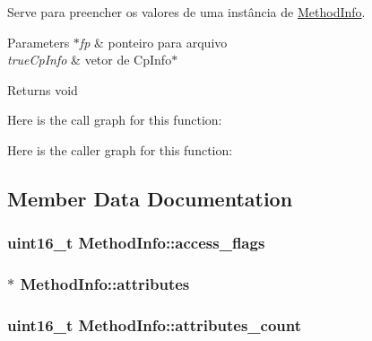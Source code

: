 Serve para preencher os valores de uma instância de \hyperlink{struct_method_info}{Method\+Info}. 


\begin{DoxyParams}{Parameters}
{\em $\ast$fp} & ponteiro para arquivo \\
\hline
{\em true\+Cp\+Info} & vetor de Cp\+Info$\ast$ \\
\hline
\end{DoxyParams}
\begin{DoxyReturn}{Returns}
void 
\end{DoxyReturn}


Here is the call graph for this function\+:




Here is the caller graph for this function\+:




\subsection{Member Data Documentation}
\subsubsection[{\texorpdfstring{access\+\_\+flags}{access_flags}}]{\setlength{\rightskip}{0pt plus 5cm}uint16\+\_\+t Method\+Info\+::access\+\_\+flags}\hypertarget{struct_method_info_ab24f22a8b4e3dcae351b0aa9dc6b7051}{}\label{struct_method_info_ab24f22a8b4e3dcae351b0aa9dc6b7051}
\subsubsection[{\texorpdfstring{attributes}{attributes}}]{$\ast$ Method\+Info\+::attributes}\hypertarget{struct_method_info_af480b7ee48a3812864ef16e3f0b44051}{}\label{struct_method_info_af480b7ee48a3812864ef16e3f0b44051}
\subsubsection[{\texorpdfstring{attributes\+\_\+count}{attributes_count}}]{\setlength{\rightskip}{0pt plus 5cm}uint16\+\_\+t Method\+Info\+::attributes\+\_\+count}\hypertarget{struct_method_info_ac7a3912757dd3af6ac55988fd42305f4}{}\label{struct_method_info_ac7a3912757dd3af6ac55988fd42305f4}
